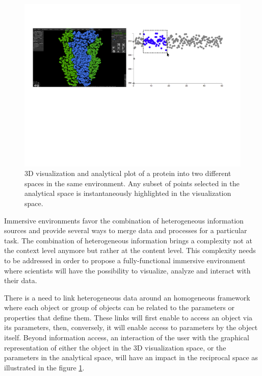 \documentclass{vgtc}                          %
\begin{document}
\begin{figure}[htb]
  \centering
  \includegraphics[width=\linewidth, frame]{figures/interactive_selection.pdf}
  \caption{3D visualization and analytical plot of a protein into two different spaces in the same environment. Any subset of points selected in the analytical space is instantaneously highlighted in the visualization space.}
  \label{interactive_selection}
\end{figure}

Immersive environments favor the combination of heterogeneous information sources and provide several ways to merge data and processes for a particular task. The combination of heterogeneous information brings a complexity not at the context level anymore but rather at the content level. This complexity needs to be addressed in order to propose a fully-functional immersive environment where scientists will have the possibility to visualize, analyze and interact with their data.

There is a need to link heterogeneous data around an homogeneous framework where each object or group of objects can be related to the parameters or properties that define them. These links will first enable to access an object via its parameters, then, conversely, it will enable access to parameters by the object itself. Beyond information access, an interaction of the user with the graphical representation of either the object in the 3D visualization space, or the parameters in the analytical space, will have an impact in the reciprocal space as illustrated in the figure \ref{interactive_selection}.
\end{document}
